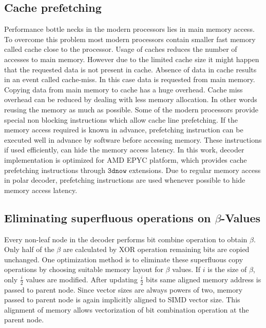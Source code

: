 \subsection{Cache prefetching}
Performance bottle necks in the modern processors lies in main memory access. To overcome this problem most modern processors contain smaller fast memory called cache close to the processor. Usage of caches reduces the number of accesses to main memory. However due to the limited cache size it might happen that the requested data is not present in cache. Absence of data in cache results in an event called cache-miss. In this case data is requested from main memory. Copying data from main memory to cache has a huge overhead. Cache miss overhead can be reduced by dealing with less memory allocation. In other words reusing the memory as much as possible. Some of the modern processors provide special non blocking instructions which allow cache line prefetching. If the memory access required is known in advance, prefetching instruction can be executed well in advance by software before accessing memory. These instructions if used efficiently, can hide the memory access latency. In this work, decoder implementation is optimized for AMD EPYC platform, which provides cache prefetching instructions through $ \mathtt{3dnow} $ extensions. Due to regular memory access in polar decoder, prefetching instructions are used whenever possible to hide memory access latency.

\subsection {Eliminating superfluous operations on $\beta$-Values}
Every non-leaf node in the decoder performs bit combine operation to obtain $\beta$. Only half of the $\beta$ are calculated by XOR operation remaining bits are copied unchanged. One optimization method is to eliminate these superfluous copy operations by choosing suitable memory layout for $\beta$ values. If $i$ is the size of $\beta$, only $\frac{i}{2}$ values are modified. After updating $\frac{i}{2}$ bits same aligned memory address is passed to parent node. Since vector sizes are always powers of two, memory passed to parent node is again implicitly aligned to SIMD vector size. This alignment of memory allows vectorization of bit combination operation at the parent node.

